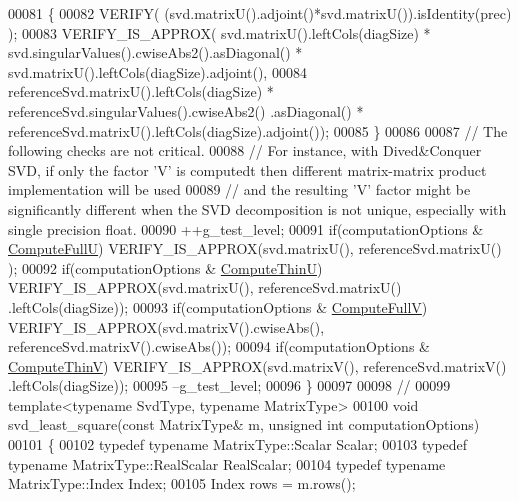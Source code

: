 \begin{DoxyCode}
00081   \{
00082     VERIFY( (svd.matrixU().adjoint()*svd.matrixU()).isIdentity(prec) );
00083     VERIFY\_IS\_APPROX( svd.matrixU().leftCols(diagSize) * svd.singularValues().cwiseAbs2().asDiagonal() * 
      svd.matrixU().leftCols(diagSize).adjoint(),
00084                       referenceSvd.matrixU().leftCols(diagSize) * referenceSvd.singularValues().cwiseAbs2()
      .asDiagonal() * referenceSvd.matrixU().leftCols(diagSize).adjoint());
00085   \}
00086   
00087   \textcolor{comment}{// The following checks are not critical.}
00088   \textcolor{comment}{// For instance, with Dived&Conquer SVD, if only the factor 'V' is computedt then different matrix-matrix
       product implementation will be used}
00089   \textcolor{comment}{// and the resulting 'V' factor might be significantly different when the SVD decomposition is not
       unique, especially with single precision float.}
00090   ++g\_test\_level;
00091   \textcolor{keywordflow}{if}(computationOptions & \hyperlink{group__enums_ggae3e239fb70022eb8747994cf5d68b4a9a2b4f91ca5859a4159dbfe8090043817f}{ComputeFullU})  VERIFY\_IS\_APPROX(svd.matrixU(), referenceSvd.matrixU()
      );
00092   \textcolor{keywordflow}{if}(computationOptions & \hyperlink{group__enums_ggae3e239fb70022eb8747994cf5d68b4a9af8c742a1aa87773e165eae406c9ccaf8}{ComputeThinU})  VERIFY\_IS\_APPROX(svd.matrixU(), referenceSvd.matrixU()
      .leftCols(diagSize));
00093   \textcolor{keywordflow}{if}(computationOptions & \hyperlink{group__enums_ggae3e239fb70022eb8747994cf5d68b4a9a52c6f7e80bbf9a42297c88f700245b51}{ComputeFullV})  VERIFY\_IS\_APPROX(svd.matrixV().cwiseAbs(), 
      referenceSvd.matrixV().cwiseAbs());
00094   \textcolor{keywordflow}{if}(computationOptions & \hyperlink{group__enums_ggae3e239fb70022eb8747994cf5d68b4a9a1055e53fa95c8ae04a07ebb72cfafd95}{ComputeThinV})  VERIFY\_IS\_APPROX(svd.matrixV(), referenceSvd.matrixV()
      .leftCols(diagSize));
00095   --g\_test\_level;
00096 \}
00097 
00098 \textcolor{comment}{//}
00099 \textcolor{keyword}{template}<\textcolor{keyword}{typename} SvdType, \textcolor{keyword}{typename} MatrixType>
00100 \textcolor{keywordtype}{void} svd\_least\_square(\textcolor{keyword}{const} MatrixType& m, \textcolor{keywordtype}{unsigned} \textcolor{keywordtype}{int} computationOptions)
00101 \{
00102   \textcolor{keyword}{typedef} \textcolor{keyword}{typename} MatrixType::Scalar Scalar;
00103   \textcolor{keyword}{typedef} \textcolor{keyword}{typename} MatrixType::RealScalar RealScalar;
00104   \textcolor{keyword}{typedef} \textcolor{keyword}{typename} MatrixType::Index Index;
00105   Index rows = m.rows();

\end{DoxyCode}

